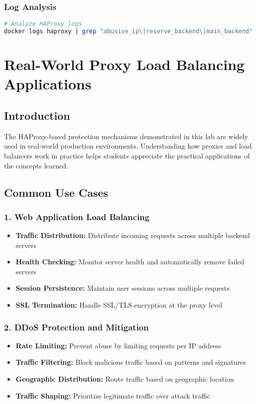 \documentclass[12pt]{article}
\begin{document}
\subsubsection{Log Analysis}
\begin{lstlisting}[language=bash]
# Analyze HAProxy logs
docker logs haproxy | grep "abusive_ip\|reserve_backend\|main_backend"
\end{lstlisting}

\section{Real-World Proxy Load Balancing Applications}

\subsection{Introduction}
The HAProxy-based protection mechanisms demonstrated in this lab are widely used in real-world production environments. Understanding how proxies and load balancers work in practice helps students appreciate the practical applications of the concepts learned.

\subsection{Common Use Cases}

\subsubsection{1. Web Application Load Balancing}
\begin{itemize}
    \item \textbf{Traffic Distribution:} Distribute incoming requests across multiple backend servers
    \item \textbf{Health Checking:} Monitor server health and automatically remove failed servers
    \item \textbf{Session Persistence:} Maintain user sessions across multiple requests
    \item \textbf{SSL Termination:} Handle SSL/TLS encryption at the proxy level
\end{itemize}

\subsubsection{2. DDoS Protection and Mitigation}
\begin{itemize}
    \item \textbf{Rate Limiting:} Prevent abuse by limiting requests per IP address
    \item \textbf{Traffic Filtering:} Block malicious traffic based on patterns and signatures
    \item \textbf{Geographic Distribution:} Route traffic based on geographic location
    \item \textbf{Traffic Shaping:} Prioritize legitimate traffic over attack traffic
\end{itemize}
\end{document}
